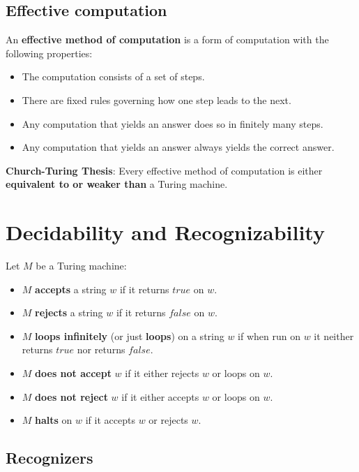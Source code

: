 \documentclass[12pt, letterpaper, oneside]{book}
\begin{document}
\subsection{Effective computation}

An \textbf{effective method of computation} is a form of computation with the following properties:
\begin{itemize}
  \item The computation consists of a set of steps.
  \item There are fixed rules governing how one step leads to the next.
  \item Any computation that yields an answer does so in finitely many steps.
  \item Any computation that yields an answer always yields the correct answer.
\end{itemize}

\textbf{Church-Turing Thesis}: Every effective method of computation is either \textbf{equivalent to or weaker than} a
Turing machine.

\section{Decidability and Recognizability}

Let $M$ be a Turing machine:
\begin{itemize}
  \item $M$ \textbf{accepts} a string $w$ if it returns $true$ on $w$.
  \item $M$ \textbf{rejects} a string $w$ if it returns $false$ on $w$.
  \item $M$ \textbf{loops infinitely} (or just \textbf{loops}) on a string $w$ if when run on $w$ it neither returns
        $true$ nor returns $false$.
  \item $M$ \textbf{does not accept} $w$ if it either rejects $w$ or loops on $w$.
  \item $M$ \textbf{does not reject} $w$ if it either accepts $w$ or loops on $w$.
  \item $M$ \textbf{halts} on $w$ if it accepts $w$ or rejects $w$.
\end{itemize}

\subsection{Recognizers}
\end{document}
